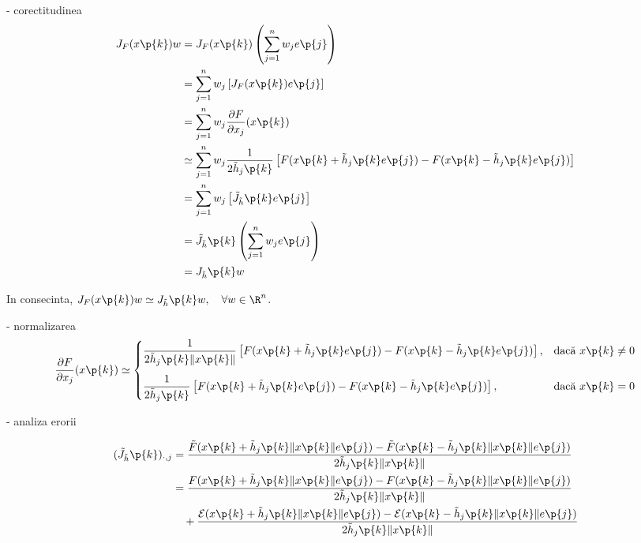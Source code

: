 \begin{demonstratie}

    \noindent- corectitudinea
    \begin{align*}
        J_F(x\p{k}) w &= J_F(x\p{k}) \left( \sum_{j=1}^n w_j e\p{j} \right) \\
        &= \sum_{j=1}^n w_j \left[ J_F(x\p{k}) e\p{j} \right] \\
        &= \sum_{j=1}^n w_j \frac{\partial F}{\partial x_j}(x\p{k}) \\
        &\simeq \sum_{j=1}^n w_j \frac{1}{2\tilde{h}_j\p{k}} \left[ F(x\p{k} + \tilde{h}_j\p{k} e\p{j}) - F(x\p{k} - \tilde{h}_j\p{k} e\p{j}) \right] \\
        &= \sum_{j=1}^n w_j \left[ \tilde{J}_{\tilde{h}}\p{k} e\p{j} \right] \\
        &= \tilde{J}_{\tilde{h}}\p{k} \left( \sum_{j=1}^n w_j e\p{j} \right) \\
        &= J_{\tilde{h}}\p{k} w
    \end{align*}

    In consecinta, $ J_F(x\p{k}) w \simeq J_{\tilde{h}}\p{k} w, \quad \forall w \in \R^n$.

    \bigskip

    \noindent- normalizarea
    $$
    \frac{\partial F}{\partial x_j}(x\p{k}) \simeq
    \begin{cases}
        \displaystyle \frac{1}{2\tilde{h}_j\p{k} \|x\p{k}\|} \left[ F(x\p{k} + \tilde{h}_j\p{k} e\p{j}) - F(x\p{k} - \tilde{h}_j\p{k} e\p{j}) \right], & \text{dacă } x\p{k} \neq 0 \\[15pt]
        \displaystyle \frac{1}{2\tilde{h}_j\p{k}} \left[ F(x\p{k} + \tilde{h}_j\p{k} e\p{j}) - F(x\p{k} - \tilde{h}_j\p{k} e\p{j}) \right], & \text{dacă } x\p{k} = 0
    \end{cases}
    $$

    \newpage

    \noindent- analiza erorii

    \begin{align*}
        (\tilde{J}_{\tilde{h}}\p{k})_{\cdot, j} &= \frac{\tilde{F}(x\p{k} + \tilde{h}_j\p{k} \|x\p{k}\| e\p{j}) - \tilde{F}(x\p{k} - \tilde{h}_j\p{k} \|x\p{k}\| e\p{j})}{2\tilde{h}_j\p{k} \|x\p{k}\|} \\
        &= \frac{F(x\p{k} + \tilde{h}_j\p{k} \|x\p{k}\| e\p{j}) - F(x\p{k} - \tilde{h}_j\p{k} \|x\p{k}\| e\p{j})}{2\tilde{h}_j\p{k} \|x\p{k}\|} \\
        &\quad + \frac{\mathcal{E}(x\p{k} + \tilde{h}_j\p{k} \|x\p{k}\| e\p{j}) - \mathcal{E}(x\p{k} - \tilde{h}_j\p{k} \|x\p{k}\| e\p{j})}{2\tilde{h}_j\p{k} \|x\p{k}\|}
    \end{align*}


\end{demonstratie}
